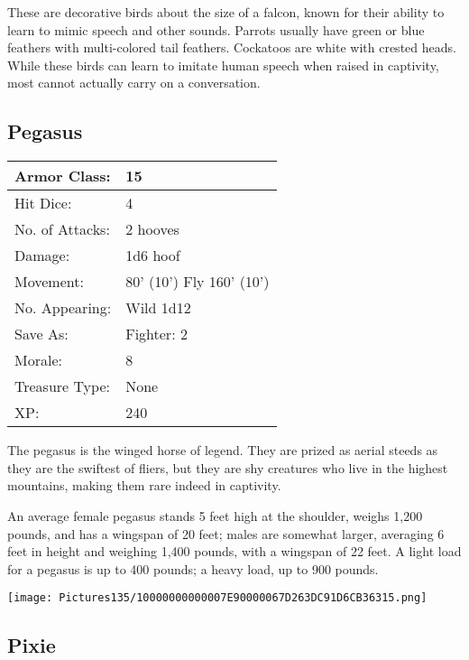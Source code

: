 \documentclass[a4paper,twoside,openany,10pt]{book}
\begin{document}
\begin{multicols}{2}
These are decorative birds about the size of a falcon, known for their ability to learn to mimic speech and other sounds. Parrots usually have green or blue feathers with multi-colored tail feathers. Cockatoos are white with crested heads. While these birds can learn to imitate human speech when raised in captivity, most cannot actually carry on a conversation.

\subsection*{Pegasus}\label{pegasus}

\begin{tabularx}{0.50\textwidth}{@{}lX@{}}
Armor Class: & 15 \\\hline
Hit Dice: & 4 \\\hline
No. of Attacks: & 2 hooves \\\hline
Damage: & 1d6 hoof \\\hline
Movement: & 80' (10') Fly
160' (10') \\\hline
No. Appearing: & Wild 1d12 \\\hline
Save As: & Fighter: 2 \\\hline
Morale: & 8 \\\hline
Treasure Type: & None \\\hline
XP: & 240 \\\hline
\end{tabularx}\medskip

The pegasus is the winged horse of legend. They are prized as aerial steeds as they are the swiftest of fliers, but they are shy creatures who live in the highest mountains, making them rare indeed in captivity. 

An average female pegasus stands 5 feet high at the shoulder, weighs 1,200 pounds, and has a wingspan of 20 feet; males are somewhat larger, averaging 6 feet in height and weighing 1,400 pounds, with a wingspan of 22 feet. A light load for a pegasus is up to 400 pounds; a heavy load, up to 900 pounds.

 \begin{center}
 	\texttt{[image: Pictures135/10000000000007E90000067D263DC91D6CB36315.png]} 
 \end{center}

\subsection*{Pixie}\label{pixie}


\end{multicols}
\end{document}
